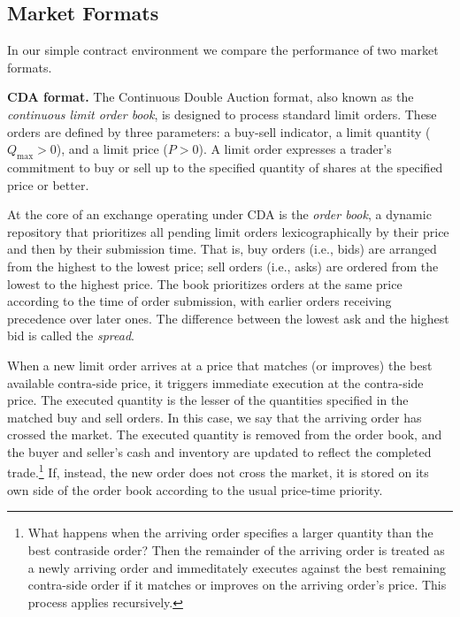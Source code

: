 \documentclass[12pt]{article}
\begin{document}
\subsection{Market Formats}\label{sect:formatimp}
In our simple contract environment we compare the performance of two market formats. 

\noindent
\textbf{CDA format.}
The Continuous Double Auction format, also known as the \textit{continuous limit order book}, is designed to process standard limit orders.
These orders are defined by three parameters: a buy-sell indicator, a limit quantity ($Q_{\max}>0
$), and a limit price ($P>0$). A limit order expresses a trader's commitment to buy or sell up to the specified quantity of shares at the specified price or better.

At the core of an exchange operating under CDA is the \textit{order book}, a dynamic repository that prioritizes all pending limit orders lexicographically by their price and then by their submission time. That is, buy orders (i.e., bids) are arranged from the highest to the lowest price; sell orders (i.e., asks) are ordered from the lowest to the highest price. The book prioritizes orders at the same price according to the time of order submission, with earlier orders receiving precedence over later ones. The difference between the lowest ask and the highest bid is called the \textit{spread}.

When a new limit order arrives at a price that matches (or improves) the best available contra-side price, it triggers immediate execution at the contra-side price. 
The executed quantity is the lesser of the quantities specified in the matched buy and sell orders. 
In this case, we say that the arriving order has crossed the market. 
The executed quantity is removed from the order book, and the buyer and seller's cash and inventory are updated to reflect the completed trade.\footnote{
What happens when the arriving order specifies a larger quantity than the best contraside order? 
Then the remainder of the arriving order is treated as a newly arriving order and immeditately executes against the best remaining contra-side order if it matches or improves on the arriving order's price. This process applies recursively.} 
If, instead, the new order does not cross the market, it is stored on its own side of the order book according to the usual price-time priority.


\end{document}
